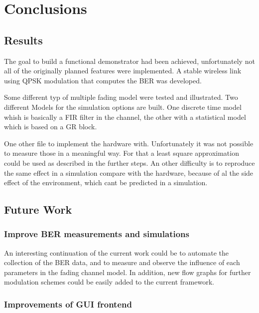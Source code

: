 
\chapter{Conclusions} \label{chp:conclusions}

\section{Results}

The goal to build a functional demonstrator had been achieved, unfortunately not all of the originally planned features were implemented. A stable wireless link using QPSK modulation that computes the BER was developed.

Some different typ of multiple fading model were tested and illustrated.
Two different Models for the simulation options are built. One discrete time model whish is  basically a FIR filter in the channel, the other with a statistical model which is based on a GR block.

One other file to implement the hardware with. Unfortunately it was not possible to measure those in a meaningful way. For that a least square approximation could be used as described in the further steps. An other difficulty is to reproduce the same effect in a simulation compare with the hardware, because of al the side effect of the environment, which cant be predicted in a simulation.


\section{Future Work}

\subsection{Improve BER measurements and simulations}

An interesting continuation of the current work could be to automate the collection of the BER data, and to measure and observe the influence of each parameters in the fading channel model. In addition, new flow graphs for further modulation schemes could be easily added to the current framework.

\subsection{Improvements of GUI frontend}

